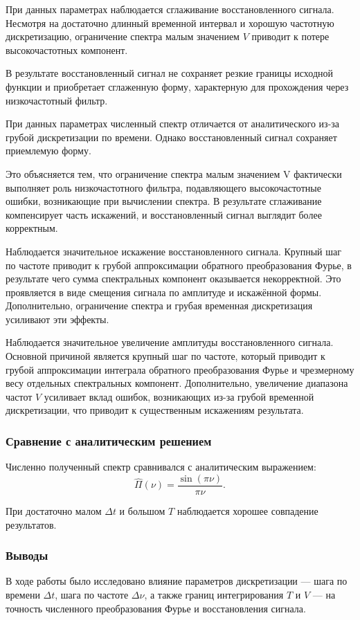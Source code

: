 \documentclass[a4paper, 12pt]{article}
\begin{document}

При данных параметрах наблюдается сглаживание восстановленного сигнала. Несмотря на достаточно длинный временной интервал и хорошую частотную дискретизацию, ограничение спектра малым значением $V$ приводит к потере высокочастотных компонент.

В результате восстановленный сигнал не сохраняет резкие границы исходной функции и приобретает сглаженную форму, характерную для прохождения через низкочастотный фильтр.


При данных параметрах численный спектр отличается от аналитического из-за грубой дискретизации по времени. Однако восстановленный сигнал сохраняет приемлемую форму.

Это объясняется тем, что ограничение спектра малым значением V фактически выполняет роль низкочастотного фильтра, подавляющего высокочастотные ошибки, возникающие при вычислении спектра. В результате сглаживание компенсирует часть искажений, и восстановленный сигнал выглядит более корректным.

Наблюдается значительное искажение восстановленного сигнала. Крупный шаг по частоте приводит к грубой аппроксимации обратного преобразования Фурье, в результате чего сумма спектральных компонент оказывается некорректной. Это проявляется в виде смещения сигнала по амплитуде и искажённой формы. Дополнительно, ограничение спектра и грубая временная дискретизация усиливают эти эффекты.

Наблюдается значительное увеличение амплитуды восстановленного сигнала. Основной причиной является крупный шаг по частоте, который приводит к грубой аппроксимации интеграла обратного преобразования Фурье и чрезмерному весу отдельных спектральных компонент. Дополнительно, увеличение диапазона частот $V$ усиливает вклад ошибок, возникающих из-за грубой временной дискретизации, что приводит к существенным искажениям результата.

\subsubsection{Сравнение с аналитическим решением}

Численно полученный спектр сравнивался с аналитическим выражением:
\[
\hat{\Pi}(\nu) = \frac{\sin(\pi \nu)}{\pi \nu}.
\]

При достаточно малом $\Delta t$ и большом $T$ наблюдается хорошее совпадение результатов.



\subsubsection{Выводы}
В ходе работы было исследовано влияние параметров дискретизации — шага по времени $\Delta t$, шага по частоте $\Delta \nu$, а также границ интегрирования $T$ и $V$ — на точность численного преобразования Фурье и восстановления сигнала.
\end{document}
